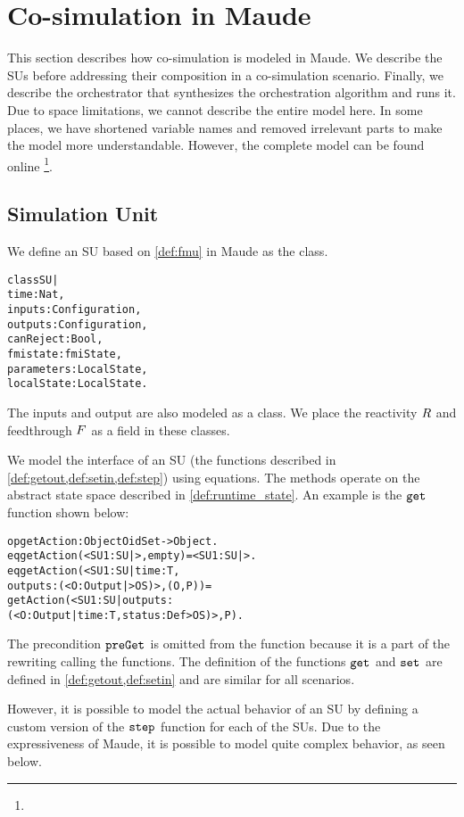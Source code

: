 \section{Co-simulation in Maude}
This section describes how co-simulation is modeled in Maude.
We describe the SUs before addressing their composition in a co-simulation scenario. Finally, we describe the orchestrator that synthesizes the orchestration algorithm and runs it.
Due to space limitations, we cannot describe the entire model here. 
In some places, we have shortened variable names and removed irrelevant parts to make the model more understandable.
However, the complete model can be found online \footnote{}.

\subsection{Simulation Unit}
We define an SU based on \cref{def:fmu} in Maude as the class.
\begin{alltt}
\small
class SU |
  time : Nat, 
  inputs : Configuration, 
  outputs : Configuration,
  canReject : Bool, 
  fmistate : fmiState,
  parameters : LocalState,
  localState : LocalState .
\end{alltt}

The inputs and output are also modeled as a class. 
We place the reactivity $R$ and feedthrough $F$ as a field in these classes.

We model the interface of an SU (the functions described in \cref{def:getout,def:setin,def:step}) using equations.
The methods operate on the abstract state space described in \cref{def:runtime_state}.
An example is the $\mathtt{get}_{}$ function shown below:

\begin{alltt}
  \small
  op getAction : Object OidSet -> Object .
  eq getAction(< SU1 : SU | >, empty) = < SU1 : SU | > .
  eq getAction(< SU1 : SU | time : T, 
    outputs : (< O : Output | > OS) >, (O , P)) = 
    getAction(< SU1 : SU | outputs : 
    (< O : Output | time : T, status : Def > OS) >, P) .
\end{alltt}

The precondition $\mathtt{preGet}_{}$ is omitted from the function because it is a part of the rewriting calling the functions.
The definition of the functions $\mathtt{get}_{}$ and $\mathtt{set}_{}$ are defined in \cref{def:getout,def:setin} and are similar for all scenarios.

However, it is possible to model the actual behavior of an SU by defining a custom version of the $\mathtt{step}_{}$ function for each of the SUs. 
Due to the expressiveness of Maude, it is possible to model quite complex behavior, as seen below.

